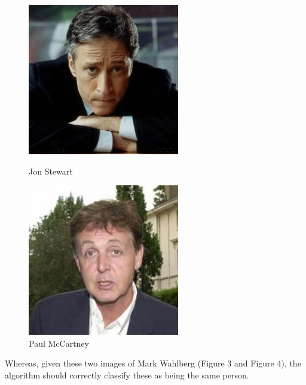 \documentclass[12pt, a4paper]{article}
\begin{document}
\begin{figure}[H]
  \includegraphics[width=\linewidth]{images/Jon_Stewart_0001.jpg}
  \caption{Jon Stewart}
\endminipage\hfill
{}
  \includegraphics[width=\linewidth]{images/Paul_McCartney_0004.jpg}
  \caption{Paul McCartney}
\endminipage\hfill
\end{figure}
Whereas, given these two images of Mark Wahlberg (Figure 3 and Figure 4), the algorithm should correctly classify these as being the same person.
\end{document}
